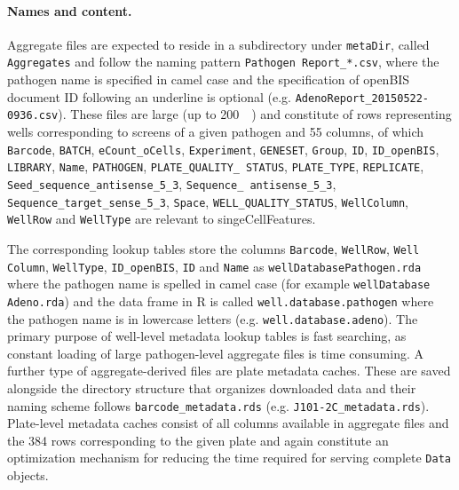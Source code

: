 \paragraph{Names and content.}
Aggregate files are expected to reside in a subdirectory under \texttt{metaDir}, called \texttt{Aggregates} and follow the naming pattern \texttt{Pathogen Report_*.csv}, where the pathogen name is specified in camel case and the specification of openBIS document ID following an underline is optional (e.g. \texttt{AdenoReport_20150522-0936.csv}). These files are large (up to \SI{200}{\mega\byte}) and constitute of rows representing wells corresponding to screens of a given patho\-gen and 55 columns, of which \texttt{Barcode}, \texttt{BATCH}, \texttt{eCount_oCells}, \texttt{Experiment}, \texttt{GENESET}, \texttt{Group}, \texttt{ID}, \texttt{ID_openBIS}, \texttt{LIBRARY}, \texttt{Name}, \texttt{PATHOGEN}, \texttt{PLATE_QUALITY_ STATUS}, \texttt{PLATE_TYPE}, \texttt{REPLICATE}, \texttt{Seed_sequence_antisense_5_3}, \texttt{Sequence_ antisense_5_3}, \texttt{Sequence_target_sense_5_3}, \texttt{Space}, \texttt{WELL_QUALITY_STATUS}, \texttt{WellColumn}, \texttt{WellRow} and \texttt{WellType} are relevant to singeCellFeatures.

The corresponding lookup tables store the columns \texttt{Barcode}, \texttt{WellRow}, \texttt{Well Column}, \texttt{WellType}, \texttt{ID_openBIS}, \texttt{ID} and \texttt{Name} as \texttt{wellDatabasePathogen.rda} where the pathogen name is spelled in camel case (for example \texttt{wellDatabase Adeno.rda}) and the data frame in R is called \texttt{well.database.pathogen} where the pathogen name is in lowercase letters (e.g. \texttt{well.database.adeno}). The primary purpose of well-level metadata lookup tables is fast searching, as constant loading of large pathogen-level aggregate files is time consuming. A further type of aggregate-derived files are plate metadata caches. These are saved alongside the directory structure that organizes downloaded data and their naming scheme follows \texttt{barcode_metadata.rds} (e.g. \texttt{J101-2C_metadata.rds}). Plate-level metadata caches consist of all columns available in aggregate files and the 384 rows corresponding to the given plate and again constitute an optimization mechanism for reducing the time required for serving complete \texttt{Data} objects.
